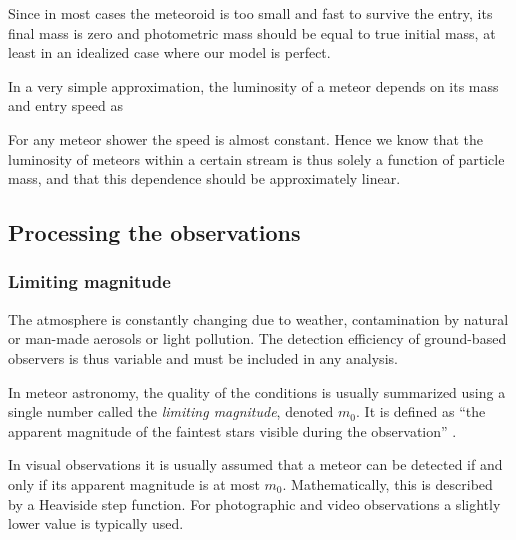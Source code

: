             Since in most cases the meteoroid is too small and fast to survive the entry, its final mass is zero
            and photometric mass should be equal to true initial mass, at least in an idealized case where our model is perfect.


            In a very simple approximation, the luminosity of a meteor depends on its mass and entry speed as

            For any meteor shower the speed is almost constant. Hence we know that the luminosity of meteors
            within a certain stream is thus solely a function of particle mass, and that this dependence should
            be approximately linear.

    \subsection{Processing the observations} \label{msp}
        \subsubsection{Limiting magnitude} \label{mspm}
            The atmosphere is constantly changing due to weather, contamination
            by natural or man-made aerosols or light pollution. The detection efficiency
            of ground-based observers is thus variable and must be included in any analysis.

            In meteor astronomy, the quality of the conditions is usually summarized
            using a single number called the \emph{limiting magnitude}, denoted $m_0$.
            It is defined as ``the apparent magnitude of the faintest stars visible during the observation'' \citep{imo-glossary}.

            In visual observations it is usually assumed that a meteor can be detected if and only if
            its apparent magnitude is at most $m_0$. Mathematically, this is described by a Heaviside step function.
            For photographic and video observations a slightly lower value is typically used.

